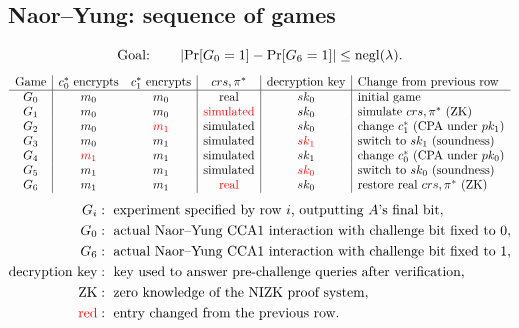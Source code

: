 \documentclass[12pt,a4paper]{article}
\begin{document}
\subsection*{Naor--Yung: sequence of games}
\[
\text{Goal:}\qquad
\left|\Pr[G_0=1]-\Pr[G_6=1]\right|\leq\operatorname{negl}(\lambda).
\]
\begingroup\small
\renewcommand{\arraystretch}{1.65}
\[
\begin{array}{c|cc|c|c|l}
\text{Game}&c_0^*\text{ encrypts}&c_1^*\text{ encrypts}
&crs,\pi^*&\text{decryption key}&\text{Change from previous row}\\
\hline
G_0&m_0&m_0&\text{real}&sk_0&\text{initial game}\\
G_1&m_0&m_0&\textcolor{red}{\text{simulated}}&sk_0&\text{simulate }crs,\pi^*\text{ (ZK)}\\
G_2&m_0&\textcolor{red}{m_1}&\text{simulated}&sk_0&\text{change }c_1^*\text{ (CPA under }pk_1\text{)}\\
G_3&m_0&m_1&\text{simulated}&\textcolor{red}{sk_1}&\text{switch to }sk_1\text{ (soundness)}\\
G_4&\textcolor{red}{m_1}&m_1&\text{simulated}&sk_1&\text{change }c_0^*\text{ (CPA under }pk_0\text{)}\\
G_5&m_1&m_1&\text{simulated}&\textcolor{red}{sk_0}&\text{switch to }sk_0\text{ (soundness)}\\
G_6&m_1&m_1&\textcolor{red}{\text{real}}&sk_0&\text{restore real }crs,\pi^*\text{ (ZK)}
\end{array}
\]
\endgroup
\[
\begin{aligned}
G_i&:\text{ experiment specified by row }i\text{, outputting }A\text{'s final bit},\\
G_0&:\text{ actual Naor--Yung CCA1 interaction with challenge bit fixed to }0,\\
G_6&:\text{ actual Naor--Yung CCA1 interaction with challenge bit fixed to }1,\\
\text{decryption key}&:\text{ key used to answer pre-challenge queries after verification},\\
\mathrm{ZK}&:\text{ zero knowledge of the NIZK proof system},\\
\textcolor{red}{\text{red}}&:\text{ entry changed from the previous row}.
\end{aligned}
\]
\end{document}
